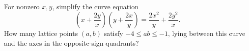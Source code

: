 For nonzero $x,y$, simplify the curve equation
\[(x+\dfrac{2y}{x})(y+\dfrac{2x}{y})=\dfrac{2x^2}{y}+\dfrac{2y^2}{x}.\]
How many lattice points $(a,b)$ satisfy $-4\le ab\le-1$, lying between this curve and the axes in the opposite-sign quadrants?
